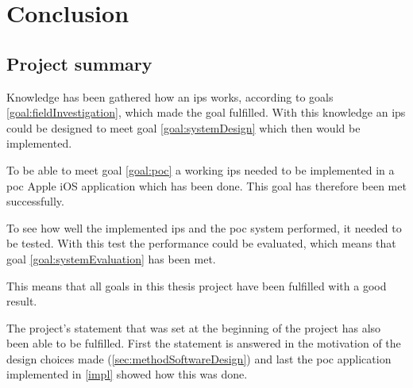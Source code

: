 \chapter{Conclusion}\label{conclusion}



\section{Project summary}\label{sec:conclusionProjectSummary}
Knowledge has been gathered how an \acrshort{ips} works, according to goals \ref{goal:fieldInvestigation}, which made the goal fulfilled.
With this knowledge an \acrshort{ips} could be designed to meet goal \ref{goal:systemDesign} which then would be implemented.

\bigskip

To be able to meet goal \ref{goal:poc} a working \acrshort{ips} needed to be implemented in a \acrfull{poc} Apple iOS application which has been done.
This goal has therefore been met successfully.

\bigskip

To see how well the implemented \acrshort{ips} and the \acrshort{poc} system performed, it needed to be tested.
With this test the performance could be evaluated, which means that goal \ref{goal:systemEvaluation} has been met.

\bigskip

This means that all goals in this thesis project have been fulfilled with a good result.

\bigskip

The project's statement that was set at the beginning of the project has also been able to be fulfilled.
First the statement is answered in the motivation of the design choices made (\cref{sec:methodSoftwareDesign}) and last the \acrshort{poc} application implemented in \cref{impl} showed how this was done.


